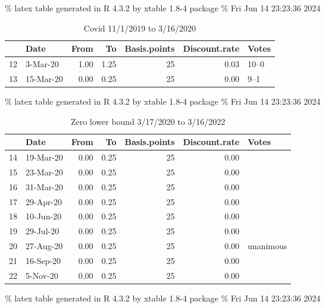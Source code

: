 \documentclass[
]{article}
\begin{document}
\% latex table generated in R 4.3.2 by xtable 1.8-4 package
\% Fri Jun 14 23:23:36 2024

\begin{table}[ht]
\centering
\begin{tabular}{rlrrrrl}
  \hline
 & Date & From & To & Basis.points & Discount.rate & Votes \\ 
  \hline
12 & 3-Mar-20 & 1.00 & 1.25 &  25 & 0.03 & 10–0 \\ 
  13 & 15-Mar-20 & 0.00 & 0.25 &  25 & 0.00 & 9–1 \\ 
   \hline
\end{tabular}
\caption{Covid 11/1/2019 to 3/16/2020} 
\label{tab:fomccovid}
\end{table}

\% latex table generated in R 4.3.2 by xtable 1.8-4 package
\% Fri Jun 14 23:23:36 2024

\begin{table}[ht]
\centering
\begin{tabular}{rlrrrrl}
  \hline
 & Date & From & To & Basis.points & Discount.rate & Votes \\ 
  \hline
14 & 19-Mar-20 & 0.00 & 0.25 &  25 & 0.00 &  \\ 
  15 & 23-Mar-20 & 0.00 & 0.25 &  25 & 0.00 &   \\ 
  16 & 31-Mar-20 & 0.00 & 0.25 &  25 & 0.00 &  \\ 
  17 & 29-Apr-20 & 0.00 & 0.25 &  25 & 0.00 &   \\ 
  18 & 10-Jun-20 & 0.00 & 0.25 &  25 & 0.00 &   \\ 
  19 & 29-Jul-20 & 0.00 & 0.25 &  25 & 0.00 &   \\ 
  20 & 27-Aug-20 & 0.00 & 0.25 &  25 & 0.00 & unanimous \\ 
  21 & 16-Sep-20 & 0.00 & 0.25 &  25 & 0.00 &   \\ 
  22 & 5-Nov-20 & 0.00 & 0.25 &  25 & 0.00 &   \\ 
   \hline
\end{tabular}
\caption{Zero lower bound 3/17/2020 to 3/16/2022} 
\label{tab:fomczlb}
\end{table}

\% latex table generated in R 4.3.2 by xtable 1.8-4 package
\% Fri Jun 14 23:23:36 2024
\end{document}
